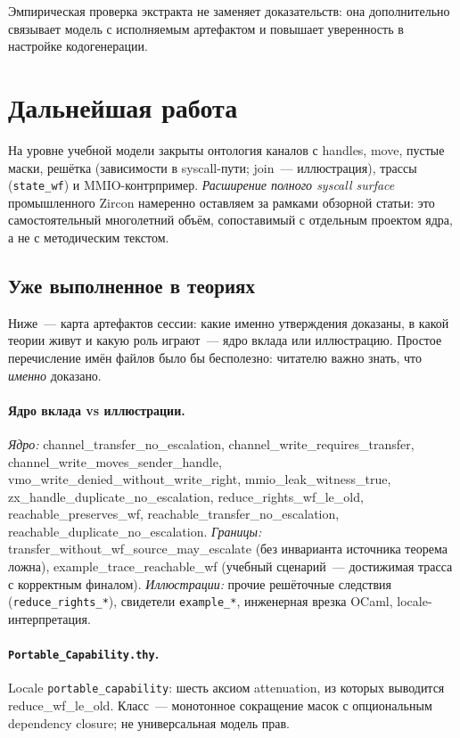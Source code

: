 \documentclass[11pt,a4paper]{article}
\newcommand{\isabel}[1]{{\isabelleit #1}}
\newcommand{\lemmaname}[1]{\isabel{#1}}
\begin{document}
Эмпирическая проверка экстракта не заменяет доказательств: она
дополнительно связывает модель с исполняемым артефактом и повышает
уверенность в настройке кодогенерации.

\section{Дальнейшая работа}

На уровне учебной модели закрыты онтология каналов с handles, move, пустые
маски, решётка (зависимости в syscall-пути; join~--- иллюстрация), трассы
(\texttt{state\_wf}) и MMIO-контрпример. \emph{Расширение полного syscall
	surface} промышленного Zircon намеренно оставляем за рамками обзорной
статьи: это самостоятельный многолетний объём, сопоставимый с отдельным
проектом ядра, а не с методическим текстом.

\subsection{Уже выполненное в теориях}

Ниже~--- карта артефактов сессии: какие именно утверждения доказаны,
в какой теории живут и какую роль играют~--- ядро вклада или
иллюстрацию. Простое перечисление имён файлов было бы бесполезно:
читателю важно знать, что \emph{именно} доказано.

\paragraph{Ядро вклада vs иллюстрации.}
\emph{Ядро:}
\lemmaname{channel\_transfer\_no\_escalation},
\lemmaname{channel\_write\_requires\_transfer},
\lemmaname{channel\_write\_moves\_sender\_handle},
\lemmaname{vmo\_write\_denied\_without\_write\_right},
\lemmaname{mmio\_leak\_witness\_true},
\lemmaname{zx\_handle\_duplicate\_no\_escalation},
\lemmaname{reduce\_rights\_wf\_le\_old},
\lemmaname{reachable\_preserves\_wf},
\lemmaname{reachable\_transfer\_no\_escalation},
\lemmaname{reachable\_duplicate\_no\_escalation}.
\emph{Границы:} \lemmaname{transfer\_without\_wf\_source\_may\_escalate}
(без инварианта источника теорема ложна),
\lemmaname{example\_trace\_reachable\_wf} (учебный сценарий~---
достижимая трасса с корректным финалом).
\emph{Иллюстрации:} прочие решёточные следствия
(\texttt{reduce\_rights\_*}), свидетели \texttt{example\_*},
инженерная врезка OCaml, locale-интерпретация.

\paragraph{\texttt{Portable\_Capability.thy}.}
Locale \texttt{portable\_capability}: шесть аксиом attenuation, из
которых выводится \lemmaname{reduce\_wf\_le\_old}. Класс~--- монотонное
сокращение масок с опциональным dependency closure; не универсальная
модель прав.
\end{document}
